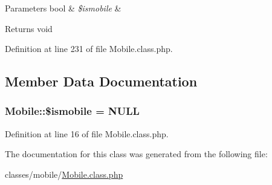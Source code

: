 \begin{DoxyParams}[1]{Parameters}
bool & {\em \$ismobile} & \\
\hline
\end{DoxyParams}
\begin{DoxyReturn}{Returns}
void 
\end{DoxyReturn}


Definition at line 231 of file Mobile.\+class.\+php.



\subsection{Member Data Documentation}
\hypertarget{classMobile_a321b198b13267ac948fb78b6dc09de4e}{}
\subsubsection[{\$ismobile}]{\setlength{\rightskip}{0pt plus 5cm}Mobile\+::\$ismobile = N\+U\+L\+L}\label{classMobile_a321b198b13267ac948fb78b6dc09de4e}


Definition at line 16 of file Mobile.\+class.\+php.



The documentation for this class was generated from the following file\+:\begin{DoxyCompactItemize}
\item 
classes/mobile/\hyperlink{classes_2mobile_2mobile_8class_8php}{Mobile.\+class.\+php}\end{DoxyCompactItemize}
